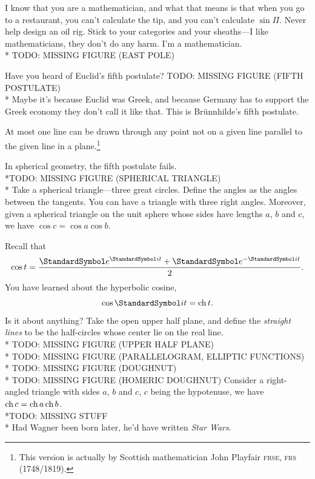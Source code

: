 \documentclass[10pt, a4paper, twoside]{lecturenotes}
\begin{document}
I know that you are a mathematician, and what that means is that when you go to a restaurant, you can't calculate the tip, and you can't calculate $\sin \Pi$. Never help design an oil rig. Stick to your categories and your sheaths---I like mathematicians, they don't do any harm. I'm a mathematician.\\*
TODO: MISSING FIGURE (EAST POLE)

Have you heard of Euclid's fifth postulate?
TODO: MISSING FIGURE (FIFTH POSTULATE)\\*
Maybe it's because Euclid was Greek, and because Germany has to support the Greek economy they don't call it like that. This is Brünnhilde's fifth postulate.
\begin{postulate}
At most one line can be drawn through any point not on a given line parallel to the given line in a plane.\footnote{This version is actually by Scottish mathematician John Playfair \textsc{frse}, \textsc{frs} (1748/1819).}
\end{postulate}
In spherical geometry, the fifth postulate fails.
\\*TODO: MISSING FIGURE (SPHERICAL TRIANGLE)\\*
Take a spherical triangle---three great circles. Define the angles as the angles between the tangents. You can have a triangle with three right angles.
Moreover, given a spherical triangle on the unit sphere whose sides have lengths $a$, $b$ and $c$, we have $\cos c = \cos a\cos b$.

Recall that \[\cos t = \frac{\E^{\I t}+\E^{-\I t}}{2}\text.\] You have learned about the hyperbolic cosine, \[\cos \I t = \HyperbolicCosine t\text.\]
Is it about anything? Take the open upper half plane, and define the \emph{straight lines} to be the half-circles whose center lie on the real line.\\*
TODO: MISSING FIGURE (UPPER HALF PLANE)\\*
TODO: MISSING FIGURE (PARALLELOGRAM, ELLIPTIC FUNCTIONS)\\*
TODO: MISSING FIGURE (DOUGHNUT)\\*
TODO: MISSING FIGURE (HOMERIC DOUGHNUT)
Consider a right-angled triangle with sides $a$, $b$ and $c$, $c$ being the hypotenuse, we have $\operatorname{ch} c = \operatorname{ch} a \operatorname{ch} b$.
\\*TODO: MISSING STUFF\\*
Had Wagner been born later, he'd have written \emph{Star Wars}.
\end{document}
